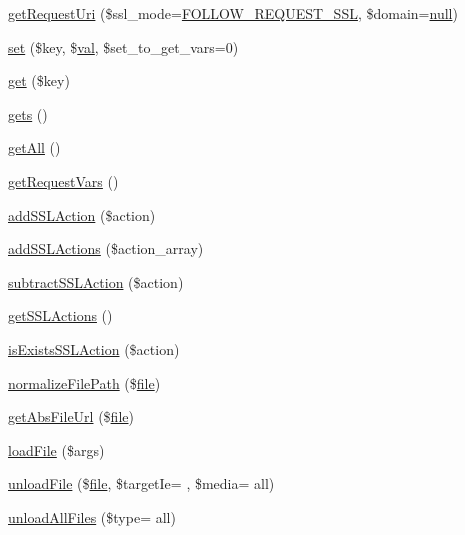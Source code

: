 \begin{DoxyCompactItemize}
\item 
\hyperlink{classContext_aa79578cfccee4d7f7c4890dc6e36ff90}{get\+Request\+Uri} (\$ssl\+\_\+mode=\hyperlink{Context_8class_8php_a546ef85538017b41b2928e818066989d}{F\+O\+L\+L\+O\+W\+\_\+\+R\+E\+Q\+U\+E\+S\+T\+\_\+\+S\+SL}, \$domain=\hyperlink{modernizr_8min_8js_a286f9ec831c5e676eeb493248eab9575}{null})
\item 
\hyperlink{classContext_a9f79aa7aecf2e4d8006e517844523fc2}{set} (\$key, \$\hyperlink{ckeditor_2js_2xe__interface_8js_a4fb96abdf073a439bca5e051c333b35d}{val}, \$set\+\_\+to\+\_\+get\+\_\+vars=0)
\item 
\hyperlink{classContext_a90ce25d65fe6c9778421cbb36ab3def5}{get} (\$key)
\item 
\hyperlink{classContext_ae906c0b1533a8e4ce7836d3665b46288}{gets} ()
\item 
\hyperlink{classContext_a89ad6fd5c093e257e82822d16dc67ac4}{get\+All} ()
\item 
\hyperlink{classContext_a9ddbc79a7ba5892d1ea2d793f6ad52c2}{get\+Request\+Vars} ()
\item 
\hyperlink{classContext_a781f5e7a057e6f0992310318a0339ae8}{add\+S\+S\+L\+Action} (\$action)
\item 
\hyperlink{classContext_ab2acd5415515b232b7cf9f0130f4efa3}{add\+S\+S\+L\+Actions} (\$action\+\_\+array)
\item 
\hyperlink{classContext_a598cb5c571c0a1ffb15f67064e251f0d}{subtract\+S\+S\+L\+Action} (\$action)
\item 
\hyperlink{classContext_a10b68bdba6f55bc725c352aad7844dc7}{get\+S\+S\+L\+Actions} ()
\item 
\hyperlink{classContext_ada5b689e4d143f371c38091b87cfd864}{is\+Exists\+S\+S\+L\+Action} (\$action)
\item 
\hyperlink{classContext_a47a8a7878385f0d5cb7085f933157128}{normalize\+File\+Path} (\$\hyperlink{classfile}{file})
\item 
\hyperlink{classContext_a217a7ff0e32178c6a2cc761de9c88998}{get\+Abs\+File\+Url} (\$\hyperlink{classfile}{file})
\item 
\hyperlink{classContext_a01ddbd076a74f16dc46d3c7b358daea6}{load\+File} (\$args)
\item 
\hyperlink{classContext_afab39232525ca876120253feee0fe3a1}{unload\+File} (\$\hyperlink{classfile}{file}, \$target\+Ie= \textquotesingle{}\textquotesingle{}, \$media= \textquotesingle{}all\textquotesingle{})
\item 
\hyperlink{classContext_a9125192700ddd7a2234f34a192165902}{unload\+All\+Files} (\$type= \textquotesingle{}all\textquotesingle{})

\end{DoxyCompactItemize}
